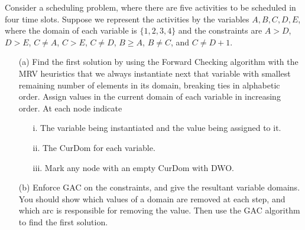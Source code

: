 \documentclass[a4paper, 11pt]{article}
\begin{document}
\begin{question}\normalfont
    Consider a scheduling problem, where there are five activities to be scheduled in four time slots. Suppose we represent the activities by the variables $A, B,  C, D, E$, where the domain of each variable is $\{1,2,3,4\}$ and the constraints are $A > D$, $D > E$, $C \ne A$, $C > E$, $C \ne D$, $B \geq A$, $B \ne C$, and $C \ne D + 1$.
    \begin{itemize}
    \item [(a)] Find the first solution by using the Forward Checking algorithm with the MRV heuristics that we always instantiate next that variable with smallest remaining number of elements in its domain, breaking ties in alphabetic order. Assign values in the current domain of each variable in increasing order. At each node indicate
    \begin{itemize}
        \item [i.] The variable being instantiated and the value being assigned to it.
        \item [ii.] The CurDom for each variable.
        \item [iii.] Mark any node with an empty CurDom with DWO.
    \end{itemize}
    \item [(b)] Enforce GAC on the constraints, and give the resultant variable domains. You should show which values of a domain are removed at each step, and which arc is responsible for removing the value. Then use the GAC algorithm to find the first solution.
    \end{itemize}
\end{question}
\end{document}
